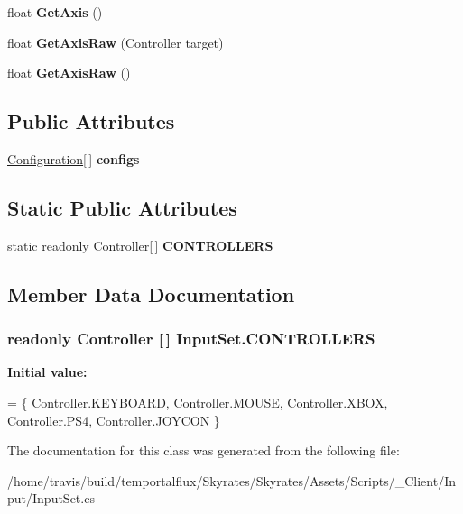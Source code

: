 \begin{DoxyCompactItemize}
\item 
\hypertarget{class_input_set_af8931805038f0669e59fca395df3d57e}{float {\bfseries Get\-Axis} ()}\label{class_input_set_af8931805038f0669e59fca395df3d57e}

\item 
\hypertarget{class_input_set_a1d75bc18c4a3aa1502f5dd7425b05727}{float {\bfseries Get\-Axis\-Raw} (Controller target)}\label{class_input_set_a1d75bc18c4a3aa1502f5dd7425b05727}

\item 
\hypertarget{class_input_set_a963d94499e9688969ecc994cdd16a617}{float {\bfseries Get\-Axis\-Raw} ()}\label{class_input_set_a963d94499e9688969ecc994cdd16a617}

\end{DoxyCompactItemize}
\subsection*{Public Attributes}
\begin{DoxyCompactItemize}
\item 
\hypertarget{class_input_set_a0abd212fb70ec442533d75c9e462481e}{\hyperlink{struct_input_set_1_1_configuration}{Configuration}\mbox{[}$\,$\mbox{]} {\bfseries configs}}\label{class_input_set_a0abd212fb70ec442533d75c9e462481e}

\end{DoxyCompactItemize}
\subsection*{Static Public Attributes}
\begin{DoxyCompactItemize}
\item 
static readonly Controller\mbox{[}$\,$\mbox{]} {\bfseries C\-O\-N\-T\-R\-O\-L\-L\-E\-R\-S}
\end{DoxyCompactItemize}


\subsection{Member Data Documentation}
\hypertarget{class_input_set_a634e0ee45a4e461fc4eb6b689b3e3a2e}{
\subsubsection[{C\-O\-N\-T\-R\-O\-L\-L\-E\-R\-S}]{\setlength{\rightskip}{0pt plus 5cm}readonly Controller \mbox{[}$\,$\mbox{]} Input\-Set.\-C\-O\-N\-T\-R\-O\-L\-L\-E\-R\-S\hspace{0.3cm}{\ttfamily [static]}}}\label{class_input_set_a634e0ee45a4e461fc4eb6b689b3e3a2e}
{\bfseries Initial value\-:}
\begin{DoxyCode}
=
    \{
        Controller.KEYBOARD, Controller.MOUSE,
        Controller.XBOX, Controller.PS4,
        Controller.JOYCON
    \}
\end{DoxyCode}


The documentation for this class was generated from the following file\-:\begin{DoxyCompactItemize}
\item 
/home/travis/build/temportalflux/\-Skyrates/\-Skyrates/\-Assets/\-Scripts/\-\_\-\-Client/\-Input/Input\-Set.\-cs\end{DoxyCompactItemize}
